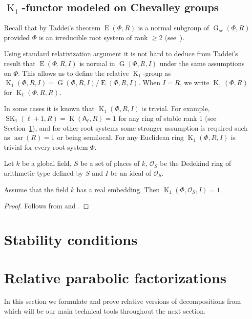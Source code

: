 \documentclass[12pt]{amsart}
\numberwithin{equation}{section}
\theoremstyle{definition}
\DeclareMathOperator{\K}{K}
\DeclareMathOperator{\SK}{SK}
\DeclareMathOperator{\G}{G}
\DeclareMathOperator{\E}{E}
\DeclareMathOperator{\asr}{asr}
\newcommand{\rA}{\mathsf{A}}
\begin{document}
\subsection{$\K_1$-functor modeled on Chevalley groups}
Recall that by Taddei's theorem $\E(\Phi, R)$ is a normal subgroup of $\G_{sc}(\Phi, R)$ provided $\Phi$ is an irreducible root system of rank $\geqslant 2$ (see~\cite{Ta}).

Using standard relativization argument it is not hard to deduce from Taddei's result that $\E(\Phi,R,I)$ is normal in $\G(\Phi,R,I)$ under the same assumptions on $\Phi$.
This allows us to define the relative $\K_1$-group as $\K_1(\Phi,R,I)=\G(\Phi,R,I)/\E(\Phi,R,I).$
When $I=R$, we write $\K_1(\Phi, R)$ for $\K_1(\Phi, R, R)$.

In some cases it is known that $\K_1(\Phi, R, I)$ is trivial.
For example, $\SK_1(\ell+1,R)=\K(\rA_\ell,R)=1$ for any ring of stable rank $1$ (see Section~\ref{sec:stability-conditions}), 
and for other root systems some stronger assumption is required such as $\asr(R)=1$ or being semilocal. 
For any Euclidean ring $\K_1(\Phi, R, I)$ is trivial for every root system $\Phi$.

Let $k$ be a global field, $S$ be a set of places of $k$, 
$\mathcal{O}_S$ be the Dedekind ring of arithmetic type defined by $S$ and $I$ be an ideal of $\mathcal{O}_S$.
\begin{prop} \label{prop:K1triv} Assume that the field $k$ has a real embedding. Then $\K_1(\Phi,\mathcal{O}_S,I)=1$. \end{prop}
\begin{proof} Follows from \cite[Theorem~3.6]{BassMilnorSerre} and \cite[Corollary~4.5]{Ma69}. \end{proof}

\section{Stability conditions}\label{sec:stability-conditions}


\section{Relative parabolic factorizations} \label{sec:factorizations}
In this section we formulate and prove relative versions of decompositions from~\cite{St78} which will be our main technical tools throughout the next section.
\end{document}
